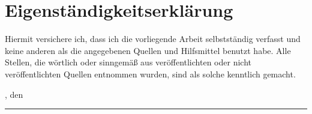 
\chapter*{Eigenständigkeitserklärung}

Hiermit versichere ich, dass ich die vorliegende Arbeit selbstständig verfasst
und keine anderen als die angegebenen Quellen und Hilfsmittel benutzt habe. Alle
Stellen, die wörtlich oder sinngemäß aus veröffentlichten oder nicht
veröffentlichten Quellen entnommen wurden, sind als solche kenntlich gemacht.

\vspace{2cm}

\submissionplace, den \submissiondate

\vspace{2cm}

\rule{0.45\textwidth}{0.4pt}

\thesisauthor
